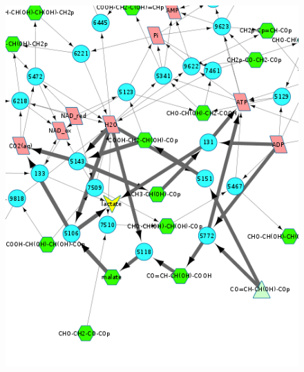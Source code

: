 \documentclass[11pt]{beamer}
\begin{document}
\begin{frame}
\begin{columns}
\begin{column}{0.5\textwidth}
				\begin{figure}
					\centering
					\includegraphics[width=1\linewidth]{final}
					
				\end{figure}
			\end{column}
		
		\end{columns}
		
		
	\end{frame}
\end{document}
